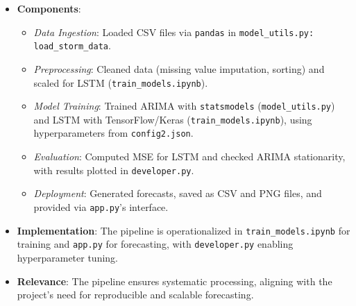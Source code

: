 {\setlength{\itemsep}{0.2em} %
	\begin{itemize}
		\item \textbf{Components}:
		{\setlength{\itemsep}{0.2em} %
			\begin{itemize}
				\item \textit{Data Ingestion}: Loaded CSV files via \texttt{pandas} in \texttt{model\_utils.py: load\_storm\_data}.
				\item \textit{Preprocessing}: Cleaned data (missing value imputation, sorting) and scaled for LSTM (\texttt{train\_models.ipynb}).
				\item \textit{Model Training}: Trained ARIMA with \texttt{statsmodels} (\texttt{model\_utils.py}) and LSTM with TensorFlow/Keras (\texttt{train\_models.ipynb}), using hyperparameters from \texttt{config2.json}.
				\item \textit{Evaluation}: Computed MSE for LSTM and checked ARIMA stationarity, with results plotted in \texttt{developer.py}.
				\item \textit{Deployment}: Generated forecasts, saved as CSV and PNG files, and provided via \texttt{app.py}'s interface.
		\end{itemize}}
		
		\item \textbf{Implementation}: The pipeline is operationalized in \texttt{train\_models.ipynb} for training and \texttt{app.py} for forecasting, with \texttt{developer.py} enabling hyperparameter tuning.
		\item \textbf{Relevance}: The pipeline ensures systematic processing, aligning with the project's need for reproducible and scalable forecasting.
\end{itemize}}


